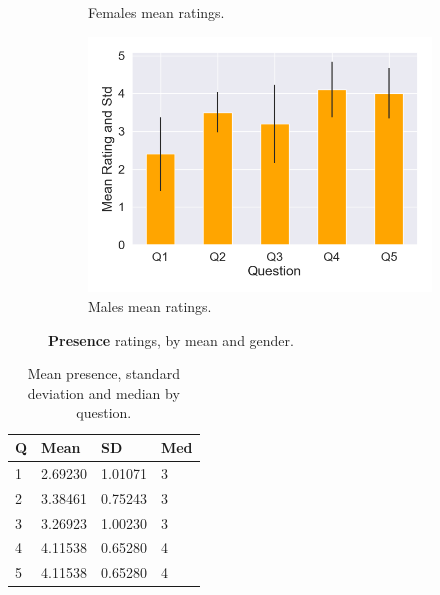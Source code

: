 \begin{figure}[H]
\begin{subfigure}[b]{0.3\textwidth}
 \caption{Females mean ratings.}
 \label{fig:presFemale}
 \end{subfigure}
  \hspace{10mm}
 \begin{subfigure}[b]{0.3\textwidth}
 \centering
 \includegraphics[scale=0.33]{Files/Plots/presence_mean_ratings_m.png}
 \caption{Males mean ratings.}
 \label{fig:presMale}
 \end{subfigure}
 \caption{\textbf{Presence} ratings, by mean and gender.}
\label{fig:presAll}
\end{figure}



\begin{table}
\begin{tabular}{|llll|}
\hline
Q & Mean & SD & Med \\
\hline
1 &  2.69230 & 1.01071&3\\  
2 &  3.38461 & 0.75243&3\\ 
3 &  3.26923 & 1.00230&3\\ 
4 &  4.11538 & 0.65280&4\\  
5 &  4.11538 & 0.65280&4\\  
\hline
\end{tabular}
\caption{Mean presence, standard deviation and median by question.}
\label{tbl:pres}
\end{table} 

\clearpage

